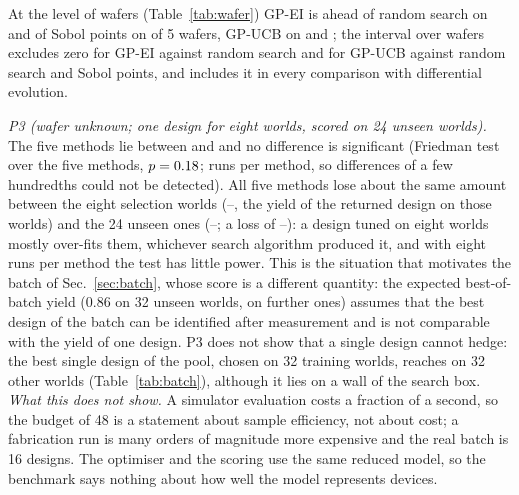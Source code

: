 At the level of wafers (Table~\ref{tab:wafer}) GP-EI is ahead of random search on \waferAheadTwoBoEiRandom{} and of Sobol points on \waferAheadTwoBoEiSobol{} of 5 wafers, GP-UCB on \waferAheadTwoBoUcbRandom{} and \waferAheadTwoBoUcbSobol{}; the interval over wafers excludes zero for GP-EI against random search and for GP-UCB against random search and Sobol points, and includes it in every comparison with differential evolution.
\begin{table}[H]\centering\small\tabWafer\caption{Optimiser benchmark at the level of wafers: the seeds of a wafer are averaged and the five wafer means are compared (mean difference of the held-out yield, 95\,\% $t$-interval over wafers, number of wafers in which the Bayesian optimiser is ahead).}\label{tab:wafer}\end{table}
\emph{P3 (wafer unknown; one design for eight worlds, scored on 24 unseen worlds).} The five methods lie between \benchThreeMin{} and \benchThreeMax{} and no difference is significant (Friedman test over the five methods, $p=0.18$; \nRunsThree{} runs per method, so differences of a few hundredths could not be detected).
All five methods lose about the same amount between the eight selection worlds (\pThreeSelLo--\pThreeSelHi, the yield of the returned design on those worlds) and the 24 unseen ones (\pThreeUnseenLo--\pThreeUnseenHi; a loss of \pThreeGapLo--\pThreeGapHi): a design tuned on eight worlds mostly over-fits them, whichever search algorithm produced it, and with eight runs per method the test has little power.
This is the situation that motivates the batch of Sec.~\ref{sec:batch}, whose score is a different quantity: the expected best-of-batch yield (0.86 on 32 unseen worlds, \othPortOther{} on \nOtherWorlds{} further ones) assumes that the best design of the batch can be identified after measurement and is not comparable with the yield of one design.
P3 does not show that a single design cannot hedge: the best single design of the pool, chosen on 32 training worlds, reaches \singleBestYield{} on 32 other worlds (Table~\ref{tab:batch}), although it lies on a wall of the search box.
\emph{What this does not show.} A simulator evaluation costs a fraction of a second, so the budget of 48 is a statement about sample efficiency, not about cost; a fabrication run is many orders of magnitude more expensive and the real batch is 16 designs.
The optimiser and the scoring use the same reduced model, so the benchmark says nothing about how well the model represents devices.

